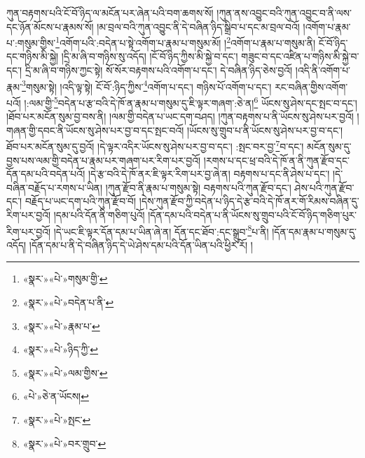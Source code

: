 ཀུན་བརྟགས་པའི་ངོ་བོ་ཉིད་ལ་མངོན་པར་ཞེན་པའི་བག་ཆགས་སོ། །ཀུན་ནས་འབྱུང་བའི་ཀུན་འབྱུང་བ་ནི་ལས་དང་ཉོན་མོངས་པ་རྣམས་སོ། །མ་བྲལ་བའི་ཀུན་འབྱུང་ནི་དེ་བཞིན་ཉིད་སྒྲིབ་པ་དང་མ་བྲལ་བའོ། །འགོག་པ་རྣམ་པ་:གསུམ་གྱིས་\footnote{«སྣར་»«པེ་»གསུམ་གྱི་}འགོག་པའི་:བདེན་པ་སྟེ་འགོག་པ་རྣམ་པ་གསུམ་མོ། །\footnote{«སྣར་»«པེ་»བདེན་པ་ནི་}འགོག་པ་རྣམ་པ་གསུམ་ནི། ངོ་བོ་ཉིད་དང་གཉིས་མི་སྐྱེ། །དྲི་མ་ཞི་བ་གཉིས་སུ་འདོད། །ངོ་བོ་ཉིད་ཀྱིས་མི་སྐྱེ་བ་དང་། གཟུང་བ་དང་འཛིན་པ་གཉིས་མི་སྐྱེ་བ་དང་། དྲི་མ་ཞི་བ་གཉིས་ཀྱང་སྟེ། སོ་སོར་བརྟགས་པའི་འགོག་པ་དང་། དེ་བཞིན་ཉིད་ཅེས་བྱའོ། །འདི་ནི་འགོག་པ་རྣམ་\footnote{«སྣར་»«པེ་»རྣམ་པ་}གསུམ་སྟེ། །འདི་ལྟ་སྟེ། ངོ་བོ་:ཉིད་ཀྱིས་\footnote{«སྣར་»«པེ་»ཉིད་ཀྱི་}འགོག་པ་དང་། གཉིས་པོ་འགོག་པ་དང་། རང་བཞིན་གྱིས་འགོག་པའོ། །:ལམ་གྱི་\footnote{«སྣར་»«པེ་»ལམ་གྱིས་}བདེན་པ་རྩ་བའི་དེ་ཁོ་ན་རྣམ་པ་གསུམ་དུ་ཇི་ལྟར་གཞག་:ཅེ་ན།\footnote{«པེ་»ཅེ་ན་ཡོངས།} ཡོངས་སུ་ཤེས་དང་སྤང་བ་དང་། །ཐོབ་པར་མངོན་སུམ་བྱ་བས་ནི། །ལམ་གྱི་བདེན་པ་ཡང་དག་བཤད། །ཀུན་བརྟགས་པ་ནི་ཡོངས་སུ་ཤེས་པར་བྱའོ། །གཞན་གྱི་དབང་ནི་ཡོངས་སུ་ཤེས་པར་བྱ་བ་དང་སྤང་བའོ། །ཡོངས་སུ་གྲུབ་པ་ནི་ཡོངས་སུ་ཤེས་པར་བྱ་བ་དང་། ཐོབ་པར་མངོན་སུམ་དུ་བྱའོ། །དེ་ལྟར་འདིར་ཡོངས་སུ་ཤེས་པར་བྱ་བ་དང་། :སྤང་བར་བྱ་\footnote{«སྣར་»«པེ་»སྤང་}བ་དང་། མངོན་སུམ་དུ་བྱས་པས་ལམ་གྱི་བདེན་པ་རྣམ་པར་གཞག་པར་རིག་པར་བྱའོ། །རགས་པ་དང་ཕྲ་བའི་དེ་ཁོ་ན་ནི་ཀུན་རྫོབ་དང་དོན་དམ་པའི་བདེན་པའོ། །དེ་རྩ་བའི་དེ་ཁོ་ནར་ཇི་ལྟར་རིག་པར་བྱ་ཞེ་ན། བརྟགས་པ་དང་ནི་ཤེས་པ་དང་། །དེ་བཞིན་བརྗོད་པ་རགས་པ་ཡིན། །ཀུན་རྫོབ་ནི་རྣམ་པ་གསུམ་སྟེ། བརྟགས་པའི་ཀུན་རྫོབ་དང་། ཤེས་པའི་ཀུན་རྫོབ་དང་། བརྗོད་པ་ཡང་དག་པའི་ཀུན་རྫོབ་བོ། །དེས་ཀུན་རྫོབ་ཀྱི་བདེན་པ་ཉིད་དེ་རྩ་བའི་དེ་ཁོ་ནར་གོ་རིམས་བཞིན་དུ་རིག་པར་བྱའོ། །དམ་པའི་དོན་ནི་གཅིག་པུའོ། །དོན་དམ་པའི་བདེན་པ་ནི་ཡོངས་སུ་གྲུབ་པའི་ངོ་བོ་ཉིད་གཅིག་པུར་རིག་པར་བྱའོ། །དེ་ཡང་ཇི་ལྟར་དོན་དམ་པ་ཡིན་ཞེ་ན། དོན་དང་ཐོབ་:དང་སྒྲུབ་\footnote{«སྣར་»«པེ་»བར་གྲུབ་}པ་ནི། །དོན་དམ་རྣམ་པ་གསུམ་དུ་འདོད། །དོན་དམ་པ་ནི་དེ་བཞིན་ཉིད་དེ་ཡེ་ཤེས་དམ་པའི་དོན་ཡིན་པའི་ཕྱིར་རོ། །
